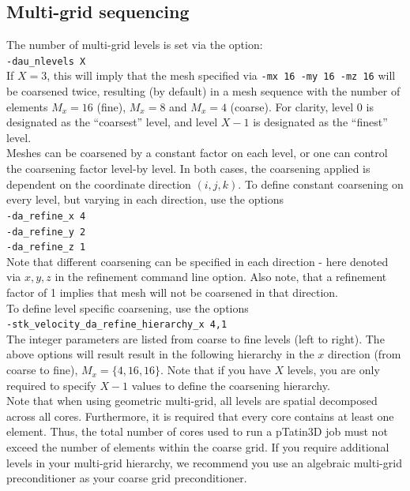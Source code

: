 \documentclass[paper=a4, fontsize=11pt,twoside]{scrartcl}
\newcommand{\ptat}{{{\sc pTatin3D}}}
\newcommand{\shellcmd}[1]{\\\indent\indent\texttt{\hspace{5mm}\footnotesize #1}\\}
\newcommand{\unix}[1]{\texttt{\footnotesize #1}}
\begin{document}
{{\subsection{Multi-grid sequencing}
The number of multi-grid levels is set via the option:
\shellcmd{-dau\_nlevels X}
If $X = 3$, this will imply that the mesh specified via \unix{-mx 16 -my 16 -mz 16} will be coarsened twice, resulting (by default) in a mesh sequence with the number of elements $M_x = 16$ (fine), $M_x = 8$ and $M_x = 4$ (coarse). For clarity, level 0 is designated as the ``coarsest'' level, and level $X-1$ is designated as the ``finest'' level.
\\[8pt]
Meshes can be coarsened by a constant factor on each level, or one can control the coarsening factor level-by level.
In both cases, the coarsening applied is dependent on the coordinate direction $(i,j,k)$. 
To define constant coarsening on every level, but varying in each direction, use the options
\shellcmd{-da\_refine\_x 4\\
\indent\indent\texttt{\hspace{5mm}}-da\_refine\_y 2 \\
\indent\indent\texttt{\hspace{5mm}}-da\_refine\_z 1}
Note that different coarsening can be specified in each direction - here denoted via $x,y,z$ in the refinement command line option.
Also note, that a refinement factor of 1 implies that mesh will not be coarsened in that direction. 
\\[8pt]
To define level specific coarsening, use the options
\shellcmd{-stk\_velocity\_da\_refine\_hierarchy\_x 4,1}
The integer parameters are listed from coarse to fine levels (left to right). The above options will result result in the following hierarchy in the $x$ direction (from coarse to fine), $M_x = \{ 4, 16, 16 \}$.
Note that if you have $X$ levels, you are only required to specify $X-1$ values to define the coarsening hierarchy. 
\\[8pt]
Note that when using geometric multi-grid, all levels are spatial decomposed across all cores. Furthermore, it is required that every core contains at least one element. Thus, the total number of cores used to run a {\ptat} job must not exceed the number of elements within the coarse grid. If you require additional levels in your multi-grid hierarchy, we recommend you use an algebraic multi-grid preconditioner as your coarse grid preconditioner.

}}
\end{document}
